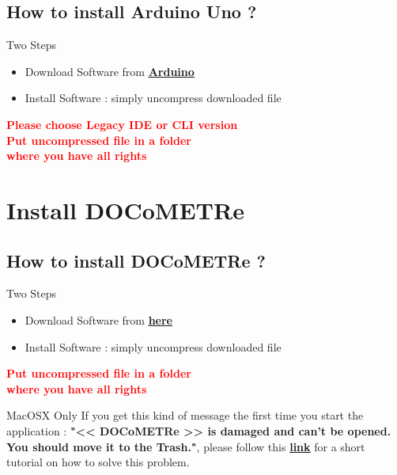 \documentclass[a4paper,11pt]{beamer}
\begin{document}
\subsection{How to install Arduino Uno ?}
\begin{frame}[containsverbatim]

\begin{block}{Two Steps}
    \begin{itemize}
        \item Download Software from \textcolor{blue}{\textbf{\underline{\href{https://www.arduino.cc/en/software}{Arduino}}}}
        \item Install Software : simply uncompress downloaded file
    \end{itemize}
\end{block}

\begin{alertblock}{}
    \centering
    \textcolor{red}{\textbf{Please choose Legacy IDE or CLI version}}\\
    \textcolor{red}{\textbf{Put uncompressed file in a folder}}\\
    \textcolor{red}{\textbf{where you have all rights}}
\end{alertblock}

\end{frame}

\section{Install DOCoMETRe}
\subsection{How to install DOCoMETRe ?}
\begin{frame}[containsverbatim]
\begin{block}{Two Steps}
    \begin{itemize}
        \item Download Software from \textcolor{blue}{\textbf{\underline{\href{https://fbuloup.github.io/DOCoMETRe/}{here}}}}
        \item Install Software : simply uncompress downloaded file
    \end{itemize}
\end{block}

\begin{alertblock}{}
    \centering
    \textcolor{red}{\textbf{Put uncompressed file in a folder}}\\
    \textcolor{red}{\textbf{where you have all rights}}
\end{alertblock}

\begin{alertblock}{MacOSX Only}
    \justifying
    If you get this kind of message the first time you start the application : \textbf{"<< DOCoMETRe >> is damaged and can't be opened. You should move it to the Trash."},
    please follow this \textcolor{blue}{\textbf{\underline{\href{https://github.com/fbuloup/DOCoMETRe/wiki/Note-for-OSX-users}{link}}}} for a short
    tutorial on how to solve this problem.
    
\end{alertblock}

\end{frame}
\end{document}
